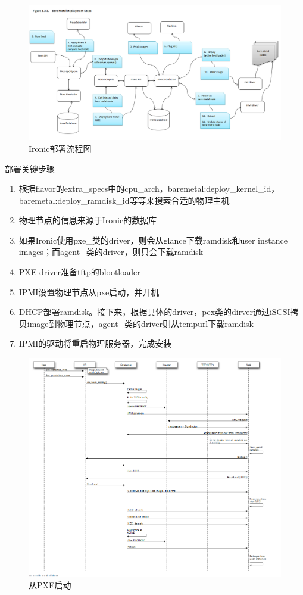 \begin{figure}[H]
  \centering
  \includegraphics[scale=0.5]{deployment_steps.png}
  \caption{Ironic部署流程图\protect\footnotemark}
  \label{fig:deployment_steps}
\end{figure}

部署关键步骤
\begin{enumerate}
  \item 根据flavor的extra\_specs中的cpu\_arch，baremetal:deploy\_kernel\_id，baremetal:deploy\_ramdisk\_id等等来搜索合适的物理主机
  \item 物理节点的信息来源于Ironic的数据库
  \item 如果Ironic使用pxe\_类的driver，则会从glance下载ramdisk和user instance images；而agent\_类的driver，则只会下载ramdisk
  \item PXE driver准备tftp的blootloader
  \item IPMI设置物理节点从pxe启动，并开机
  \item DHCP部署ramdisk。接下来，根据具体的driver，pex类的dirver通过iSCSI拷贝image到物理节点，agent\_类的driver则从tempurl下载ramdisk
  \item IPMI的驱动将重启物理服务器，完成安装
\end{enumerate}

\begin{figure}[H]
  \centering
  \includegraphics[scale=0.4]{boot_from_pxe.png}
  \caption{从PXE启动\protect\footnotemark}
  \label{fig:boot_from_pxe}
\end{figure}
